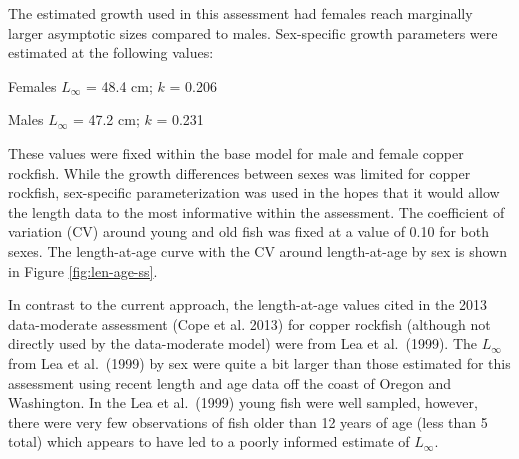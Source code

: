 \documentclass[11pt,
  english,
  a4paper,
]{article}
\begin{document}
\leavevmode\tagmcend\tagstructend\par


The estimated growth used in this assessment had females reach marginally larger asymptotic sizes compared to males. Sex-specific growth parameters were estimated at the following values:

\leavevmode\tagmcend\tagstructend\par

\begin{centering}

Females $L_{\infty}$ = 48.4 cm; $k$ = 0.206

Males $L_{\infty}$ = 47.2 cm; $k$ = 0.231

\end{centering}

\vspace{0.5cm}


These values were fixed within the base model for male and female copper rockfish. While the growth differences between sexes was limited for copper rockfish, sex-specific parameterization was used in the hopes that it would allow the length data to the most informative within the assessment. The coefficient of variation (CV) around young and old fish was fixed at a value of 0.10 for both sexes. The length-at-age curve with the CV around length-at-age by sex is shown in Figure \ref{fig:len-age-ss}.

\leavevmode\tagmcend\tagstructend\par


In contrast to the current approach, the length-at-age values cited in the 2013 data-moderate assessment {(Cope et al. 2013)\leavevmode\tagmcend\tagstructend} for copper rockfish (although not directly used by the data-moderate model) were from Lea et al.~{(1999)\leavevmode\tagmcend\tagstructend}. The {\(L_{\infty}\)\leavevmode\tagmcend\tagstructend} from Lea et al.~{(1999)\leavevmode\tagmcend\tagstructend} by sex were quite a bit larger than those estimated for this assessment using recent length and age data off the coast of Oregon and Washington. In the Lea et al.~{(1999)\leavevmode\tagmcend\tagstructend} young fish were well sampled, however, there were very few observations of fish older than 12 years of age (less than 5 total) which appears to have led to a poorly informed estimate of {\(L_{\infty}\)\leavevmode\tagmcend\tagstructend}.
\end{document}
